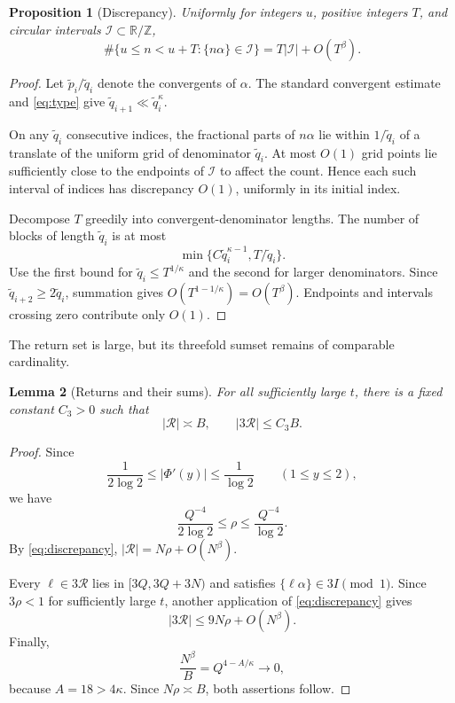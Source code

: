 \documentclass[11pt,reqno]{amsart}
\theoremstyle{definition}
\newcommand{\Z}{\mathbb Z}
\theoremstyle{plain}
\newtheorem{lemma}{Lemma}[section]
\newtheorem{proposition}[lemma]{Proposition}
\theoremstyle{definition}
\theoremstyle{remark}
\newcommand{\RR}{\mathcal R}
\begin{document}
\begin{proposition}[Discrepancy]\label{lem:discrepancy}
Uniformly for integers $u$, positive integers $T$,
and circular intervals $\mathcal I\subset\mathbb R/\Z$,
\begin{equation}\label{eq:discrepancy}
 \#\{u\le n<u+T:\{n\alpha\}\in\mathcal I\}
 =T|\mathcal I|+O(T^\beta).
\end{equation}
\end{proposition}

\begin{proof}
Let $\widetilde p_i/\widetilde q_i$ denote the
convergents of $\alpha$. The standard convergent
estimate \cite[Corollary~1.4, p.~10]{Bugeaud}
and \eqref{eq:type} give
$\widetilde q_{i+1}\ll\widetilde q_i^\kappa$.

On any $\widetilde q_i$ consecutive indices, the
fractional parts of $n\alpha$ lie within
$1/\widetilde q_i$ of a translate of the uniform
grid of denominator $\widetilde q_i$. At most
$O(1)$ grid points lie sufficiently close to the
endpoints of $\mathcal I$ to affect the count.
Hence each such interval of indices has discrepancy
$O(1)$, uniformly in its initial index.

Decompose $T$ greedily into convergent-denominator
lengths. The number of blocks of length
$\widetilde q_i$ is at most
\[
 \min\{C\widetilde q_i^{\kappa-1},
          T/\widetilde q_i\}.
\]
Use the first bound for
$\widetilde q_i\le T^{1/\kappa}$ and the second
for larger denominators. Since
$\widetilde q_{i+2}\ge2\widetilde q_i$, summation
gives $O(T^{1-1/\kappa})=O(T^\beta)$.
Endpoints and intervals crossing zero contribute
only $O(1)$.
\end{proof}

The return set is large, but its threefold sumset
remains of comparable cardinality.

\begin{lemma}[Returns and their sums]\label{lem:bohr}
For all sufficiently large $t$, there is a fixed
constant $C_3>0$ such that
\begin{equation}\label{eq:return-bohr}
 |\RR|\asymp B,\qquad |3\RR|\le C_3B.
\end{equation}
\end{lemma}

\begin{proof}
Since
\[
 \frac1{2\log2}\le|\Phi'(y)|\le\frac1{\log2}
 \qquad(1\le y\le2),
\]
we have
\[
 \frac{Q^{-4}}{2\log2}\le\rho
 \le\frac{Q^{-4}}{\log2}.
\]
By \eqref{eq:discrepancy},
$|\RR|=N\rho+O(N^\beta)$.

Every $\ell\in3\RR$ lies in $[3Q,3Q+3N)$
and satisfies $\{\ell\alpha\}\in3I\pmod1$.
Since $3\rho<1$ for sufficiently large $t$,
another application of \eqref{eq:discrepancy}
gives
\[
 |3\RR|\le9N\rho+O(N^\beta).
\]
Finally,
\[
 \frac{N^\beta}{B}=Q^{4-A/\kappa}\longrightarrow0,
\]
because $A=18>4\kappa$. Since $N\rho\asymp B$,
both assertions follow.
\end{proof}
\end{document}
